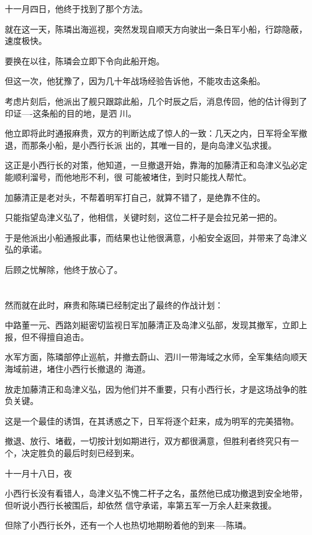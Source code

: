 \documentclass[11pt,a4paper,onecolumn]{article}
\begin{document}
十一月四日，他终于找到了那个方法。

就在这一天，陈璘出海巡视，突然发现自顺天方向驶出一条日军小船，行踪隐蔽，速度极快。

要换在以往，陈璘会立即下令向此船开炮。

但这一次，他犹豫了，因为几十年战场经验告诉他，不能攻击这条船。

考虑片刻后，他派出了舰只跟踪此船，几个时辰之后，消息传回，他的估计得到了印证----这条船的目的地，是泗
川。

他立即将此时通报麻贵，双方的判断达成了惊人的一致：几天之内，日军将全军撤退，而那条小船，是小西行长派
出的，其唯一目的，是向岛津义弘求援。

这正是小西行长的对策，他知道，一旦撤退开始，靠海的加藤清正和岛津义弘必定能顺利溜号，而他地形不利，很
可能被堵住，到时只能找人帮忙。

加藤清正是老对头，不帮着明军打自己，就算不错了，是绝靠不住的。

只能指望岛津义弘了，他相信，关键时刻，这位二杆子是会拉兄弟一把的。

于是他派出小船通报此事，而结果也让他很满意，小船安全返回，并带来了岛津义弘的承诺。

后顾之忧解除，他终于放心了。

\section[\thesection]{}

然而就在此时，麻贵和陈璘已经制定出了最终的作战计划：

中路董一元、西路刘綎密切监视日军加藤清正及岛津义弘部，发现其撤军，立即上报，但不得擅自追击。

水军方面，陈璘部停止巡航，并撤去蔚山、泗川一带海域之水师，全军集结向顺天海域前进，堵住小西行长撤退的
海道。

放走加藤清正和岛津义弘，因为他们并不重要，只有小西行长，才是这场战争的胜负关键。

这是一个最佳的诱饵，在其诱惑之下，日军将逐个赶来，成为明军的完美猎物。

撤退、放行、堵截，一切按计划如期进行，双方都很满意，但胜利者终究只有一个，决定胜负的最后时刻已经到来。

十一月十八日，夜

小西行长没有看错人，岛津义弘不愧二杆子之名，虽然他已成功撤退到安全地带，但听说小西行长被围后，却依然
信守承诺，率第五军一万余人赶来救援。

但除了小西行长外，还有一个人也热切地期盼着他的到来----陈璘。
\end{document}
